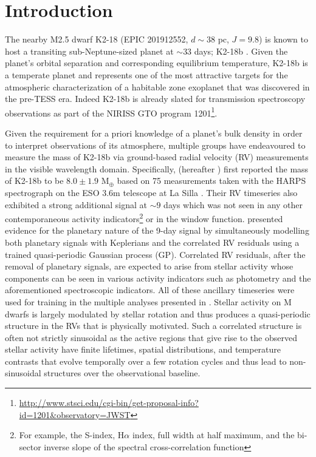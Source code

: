 
\section{Introduction}
The nearby M2.5 dwarf K2-18 (EPIC 201912552, $d\sim 38$ pc, $J=9.8$)
is known to host a transiting sub-Neptune-sized planet 
at $\sim 33$ days; K2-18b \citep{foremanmackey15b,montet15,benneke17}. Given the planet's orbital separation
and corresponding equilibrium temperature, K2-18b is a temperate planet and represents one of the
most attractive targets for the atmospheric characterization of a habitable zone exoplanet 
that was discovered in the pre-TESS era. Indeed K2-18b is already slated for transmission
spectroscopy observations as part of the NIRISS GTO program
1201\footnote{\url{http://www.stsci.edu/cgi-bin/get-proposal-info?id=1201&observatory=JWST}}.

Given the requirement for a priori knowledge of a planet's bulk density in order to interpret
observations of its atmosphere, multiple groups have endeavoured to
measure the mass of K2-18b via ground-based radial velocity (RV) measurements in the visible
wavelength domain. Specifically, \cite{cloutier17b} (hereafter )
first reported the mass of K2-18b to be
$8.0\pm 1.9$ M$_{\oplus}$ based on 75 measurements taken with the HARPS spectrograph on the ESO 3.6m
telescope at La Silla  \citep{mayor03}. 
Their RV timeseries also exhibited a strong additional signal
at $\sim 9$ days which was not seen in any other contemporaneous activity indicators\footnote{For example,  the
  S-index, H$\alpha$ index, full width at half maximum, and the bi-sector inverse slope of the spectral
  cross-correlation function} or in the window function.
 presented evidence for the
planetary nature of the 9-day signal by simultaneously modelling both planetary signals with Keplerians
and the correlated RV residuals using a trained quasi-periodic Gaussian process (GP).
Correlated RV residuals, after the removal of planetary signals, are expected to arise from
stellar activity whose components can be seen in various activity indicators such as
photometry and the aforementioned spectroscopic indicators. All of these ancillary timeseries were used
for training in the multiple analyses presented in .
Stellar activity on M dwarfs is largely modulated by stellar rotation \citep{boisse11}
and thus produces a quasi-periodic structure in the RVs that is physically motivated.
Such a correlated structure is often not strictly sinusoidal as the
active regions that give rise to the observed stellar activity have finite lifetimes, spatial
distributions, and temperature contrasts that evolve temporally over a
few rotation cycles and thus lead to non-sinusoidal structures over the observational baseline.

